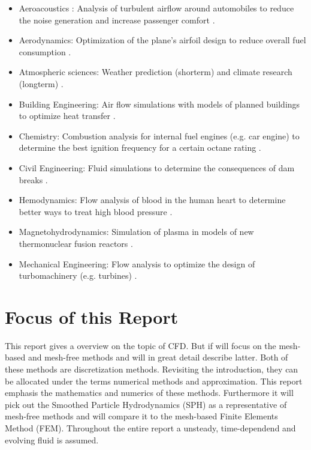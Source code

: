 \begin{itemize}
\item Aeroacoustics : Analysis of turbulent airflow around automobiles to reduce the noise generation and increase passenger comfort \citep{Naugolnych1988}.  
\item Aerodynamics: Optimization of the plane's airfoil design to reduce overall fuel consumption \citep{Anderson2010}.
\item Atmospheric sciences: Weather prediction (shorterm) \citep{Warner2010} and climate research (longterm) \citep{McGuffie2005}.
\item Building Engineering: Air flow simulations with models of planned buildings to optimize heat transfer \citep{Underwood2008}.
\item Chemistry: Combustion analysis for internal fuel engines (e.g. car engine) to determine the best ignition frequency for a certain octane rating \citep{Shi2011}.
\item Civil Engineering: Fluid simulations to determine the consequences of dam breaks \citep{Bates2005} .
\item Hemodynamics: Flow analysis of blood in the human heart to determine better ways to treat high blood pressure \citep{Guccione2009}.
\item Magnetohydrodynamics: Simulation of plasma in models of new thermonuclear fusion reactors \citep{Goedbloed2010}. 
\item Mechanical Engineering: Flow analysis to optimize the design of turbomachinery (e.g. turbines) \citep{Elder2003}.
\end{itemize}

\section{Focus of this Report}

This report gives a overview on the topic of CFD. But if will focus on the mesh-based and mesh-free methods and will in great detail describe latter. Both of these methods are discretization methods. Revisiting the introduction, they can be allocated under the terms numerical methods and approximation. This report emphasis the mathematics and numerics of these methods. Furthermore it will pick out the Smoothed Particle Hydrodynamics (SPH) as a representative of mesh-free methods and will compare it to the mesh-based Finite Elements Method (FEM). Throughout the entire report a unsteady, time-dependend and evolving fluid is assumed.

